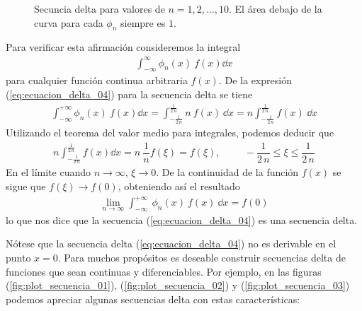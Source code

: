 \begin{figure}[H]
\centering

\caption{Secuncia delta para valores de $n=1,2,\ldots,10$. El área debajo de la curva para cada $\phi_{n}$ siempre es $1$.}
\label{fig:secuncia_delta_01}
\end{figure}
Para verificar esta afirmación consideremos la integral
\begin{align*}
\int_{-\infty}^{\infty} \phi_{n} (x) \: f(x) \dd{x}
\end{align*}
para cualquier función continua arbitraria $f(x)$. De la expresión (\ref{eq:ecuacion_delta_04}) para la secuencia delta se tiene
\begin{align*}
\int_{-\infty}^{+ \infty} \phi_{n} (x) \: f(x) \dd{x} = \int_{-\frac{1}{2 \, n}}^{\frac{1}{2 \, n}} n \: f(x) \: \dd{x} = n \int_{-\frac{1}{2 \, n}}^{\frac{1}{2 \, n}} f(x) \:  \dd{x}
\end{align*}
Utilizando el teorema del valor medio para integrales, podemos deducir que
\begin{align*}
n \int_{-\frac{1}{2 \, n}}^{\frac{1}{2 \, n}} f(x) \dd{x} = n \: \dfrac{1}{n} f(\xi) = f(\xi), \hspace{1cm} - \dfrac{1}{2 \, n} \leq \xi \leq \dfrac{1}{2 \, n}
\end{align*}
En el límite cuando $n \to \infty$, $\xi \to 0$. De la continuidad de la función $f(x)$ se sigue que $f(\xi) \to f(0)$, obteniendo así el resultado
\begin{align*}
\lim_{n \to \infty} \int_{-\infty}^{+ \infty} \: \phi_{n}(x) \: f(x) \: \dd{x} = f(0)
\end{align*}
lo que nos dice que la secuencia (\ref{eq:ecuacion_delta_04}) es una secuencia delta.
\par
Nótese que la secuencia delta (\ref{eq:ecuacion_delta_04}) no es derivable en el punto $x = 0$. Para muchos propósitos es deseable
construir secuencias delta de funciones que sean continuas y diferenciables. Por ejemplo, en las figuras (\ref{fig:plot_secuencia_01}), (\ref{fig:plot_secuencia_02}) y (\ref{fig:plot_secuencia_03}) podemos apreciar algunas secuencias delta con estas características:

